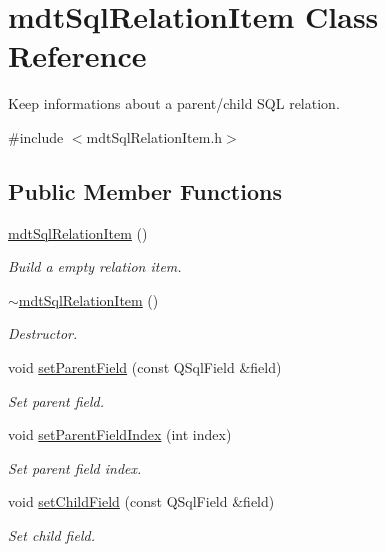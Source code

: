 \hypertarget{classmdt_sql_relation_item}{\section{mdt\-Sql\-Relation\-Item Class Reference}
\label{classmdt_sql_relation_item}
}


Keep informations about a parent/child S\-Q\-L relation.  




{\ttfamily \#include $<$mdt\-Sql\-Relation\-Item.\-h$>$}

\subsection*{Public Member Functions}
\begin{DoxyCompactItemize}
\item 
\hyperlink{classmdt_sql_relation_item_a110c3a684a857767534829ac9f24cc54}{mdt\-Sql\-Relation\-Item} ()
\begin{DoxyCompactList}\small\item\em Build a empty relation item. \end{DoxyCompactList}\item 
\hyperlink{classmdt_sql_relation_item_a6ebcdbb9adbb8dbbd353e77176989d1b}{$\sim$mdt\-Sql\-Relation\-Item} ()
\begin{DoxyCompactList}\small\item\em Destructor. \end{DoxyCompactList}\item 
void \hyperlink{classmdt_sql_relation_item_a235cd2088688f36330938e6fdbd2ed18}{set\-Parent\-Field} (const Q\-Sql\-Field \&field)
\begin{DoxyCompactList}\small\item\em Set parent field. \end{DoxyCompactList}\item 
void \hyperlink{classmdt_sql_relation_item_a63328f85e0b70aa1e588071f071a69b5}{set\-Parent\-Field\-Index} (int index)
\begin{DoxyCompactList}\small\item\em Set parent field index. \end{DoxyCompactList}\item 
void \hyperlink{classmdt_sql_relation_item_a9a2ad2ee2590c1dea371e6b64c026a73}{set\-Child\-Field} (const Q\-Sql\-Field \&field)
\begin{DoxyCompactList}\small\item\em Set child field. \end{DoxyCompactList}\item 

\end{DoxyCompactItemize}
